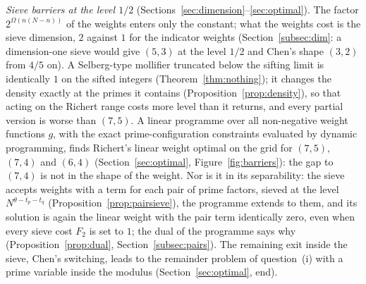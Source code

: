 \documentclass[11pt]{amsart}
\theoremstyle{remark}
\begin{document}
\emph{Sieve barriers at the level $1/2$} (Sections~\ref{sec:dimension}--\ref{sec:optimal}). The factor $2^{\Omega(n(N-n))}$ of the weights enters only the constant; what the weights cost is the sieve dimension, $2$ against $1$ for the indicator weights (Section~\ref{subsec:dim}: a dimension-one sieve would give $(5,3)$ at the level $1/2$ and Chen's shape $(3,2)$ from $4/5$ on). A Selberg-type mollifier truncated below the sifting limit is identically $1$ on the sifted integers (Theorem~\ref{thm:nothing}); it changes the density exactly at the primes it contains (Proposition~\ref{prop:density}), so that acting on the Richert range costs more level than it returns, and every partial version is worse than $(7,5)$. A linear programme over all non-negative weight functions $g$, with the exact prime-configuration constraints evaluated by dynamic programming, finds Richert's linear weight optimal on the grid for $(7,5)$, $(7,4)$ and $(6,4)$ (Section~\ref{sec:optimal}, Figure~\ref{fig:barriers}): the gap to $(7,4)$ is not in the shape of the weight. Nor is it in its separability: the sieve accepts weights with a term for each pair of prime factors, sieved at the level $N^{\theta-t_p-t_q}$ (Proposition~\ref{prop:pairsieve}), the programme extends to them, and its solution is again the linear weight with the pair term identically zero, even when every sieve cost $F_2$ is set to $1$; the dual of the programme says why (Proposition~\ref{prop:dual}, Section~\ref{subsec:pairs}). The remaining exit inside the sieve, Chen's switching, leads to the remainder problem of question~(i) with a prime variable inside the modulus (Section~\ref{sec:optimal}, end).
\end{document}
